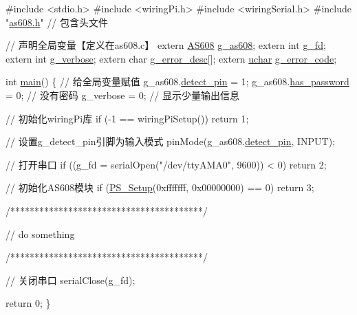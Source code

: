 \begin{DoxyCode}
\textcolor{preprocessor}{#include <stdio.h>}
\textcolor{preprocessor}{#include <wiringPi.h>}
\textcolor{preprocessor}{#include <wiringSerial.h>}
\textcolor{preprocessor}{#include "\hyperlink{as608_8h}{as608.h}"}          \textcolor{comment}{// 包含头文件}

\textcolor{comment}{// 声明全局变量【定义在as608.c】}
\textcolor{keyword}{extern} \hyperlink{struct_a_s608___module___info}{AS608} \hyperlink{as608_8c_a19c3a0b67af18ae8b8d187e21bcc6398}{g\_as608};
\textcolor{keyword}{extern} \textcolor{keywordtype}{int} \hyperlink{as608_8c_ac09e95a250275ca69c109f7bbadfef43}{g\_fd};
\textcolor{keyword}{extern} \textcolor{keywordtype}{int} \hyperlink{as608_8c_af27e3faeb692ec7ae78672182717dd18}{g\_verbose};
\textcolor{keyword}{extern} \textcolor{keywordtype}{char}  \hyperlink{as608_8c_a017d41f37a65f0f9222622b307688824}{g\_error\_desc}[];
\textcolor{keyword}{extern} \hyperlink{as608_8h_a65f85814a8290f9797005d3b28e7e5fc}{uchar} \hyperlink{as608_8c_a6957ac1dcfb11e11e72f60f78d16de53}{g\_error\_code};

\textcolor{keywordtype}{int} \hyperlink{_a_s608_2_test_2test_8cpp_a3c04138a5bfe5d72780bb7e82a18e627}{main}() \{
    \textcolor{comment}{// 给全局变量赋值}
    g\_as608.\hyperlink{struct_a_s608___module___info_aacc9cf7ae2d65e95f537eafe420f7cd0}{detect\_pin} = 1; 
    g\_as608.\hyperlink{struct_a_s608___module___info_a0fdbc2c11983db5b9007005be490be89}{has\_password} = 0;  \textcolor{comment}{// 没有密码}
    g\_verbose = 0;       \textcolor{comment}{// 显示少量输出信息}

    \textcolor{comment}{// 初始化wiringPi库}
    \textcolor{keywordflow}{if} (-1 == wiringPiSetup())
        \textcolor{keywordflow}{return} 1;

    \textcolor{comment}{// 设置g\_detect\_pin引脚为输入模式}
    pinMode(g\_as608.\hyperlink{struct_a_s608___module___info_aacc9cf7ae2d65e95f537eafe420f7cd0}{detect\_pin}, INPUT);

    \textcolor{comment}{// 打开串口}
    \textcolor{keywordflow}{if} ((g\_fd = serialOpen(\textcolor{stringliteral}{"/dev/ttyAMA0"}, 9600)) < 0)
        \textcolor{keywordflow}{return} 2;

    \textcolor{comment}{// 初始化AS608模块}
    \textcolor{keywordflow}{if} (\hyperlink{as608_8c_a522a62d36aeebd23459b2343a84a1972}{PS\_Setup}(0xfffffff, 0x00000000) == 0)
        \textcolor{keywordflow}{return} 3;

    \textcolor{comment}{/****************************************/}

    \textcolor{comment}{// do something}

    \textcolor{comment}{/****************************************/}

    \textcolor{comment}{// 关闭串口}
    serialClose(g\_fd);

    \textcolor{keywordflow}{return} 0;
\}
\end{DoxyCode}



